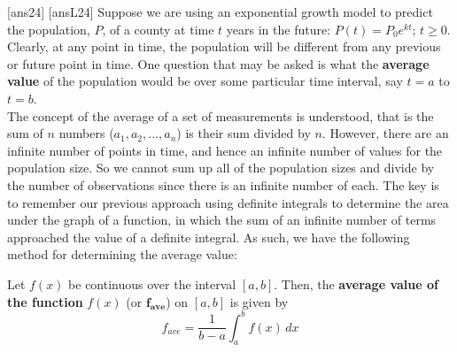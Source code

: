
\newpage
[ans24]
[ansL24]
\noindent Suppose we are using an exponential growth model to predict the population, $P$, of a county at time $t$ years in the future: $P(t)=P_0e^{kt}$; $t\ge 0$.  Clearly, at any point in time, the population will be different from any previous or future point in time.  One question that may be asked is what the \textbf{average value} of the population would be over some particular time interval, say $t=a$ to $t=b$.\\

\noindent The concept of the average of a set of measurements is understood, that is the sum of $n$ numbers ($a_1, a_2,...,a_n$) is their sum divided by $n$. However, there are an infinite number of points in time, and hence an infinite number of values for the population size.  So we cannot sum up all of the population sizes and divide by the number of observations since there is an infinite number of each.  The key is to remember our previous approach using definite integrals to determine the area under the graph of a function, in which the sum of an infinite number of terms approached the value of a definite integral.  As such, we have the following method for determining the average value:  

\begin{tcolorbox}[title = {Average Value of A Function}]

\noindent Let $f(x)$ be continuous over the interval $[a,b]$. Then, the \textbf{average value of the function} $f(x)$ (or $\bm{f_{ave}}$) on $[a,b]$ is given by
\begin{equation}\label{eq:averageValueFn}
f_{ave}=\frac{1}{b-a}\int_a^b f(x)\,dx
\end{equation}

\end{tcolorbox}

